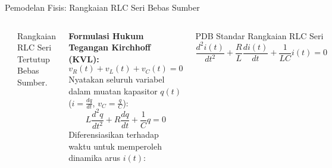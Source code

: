 \documentclass[aspectratio=169,10pt]{beamer}
\begin{document}
\begin{frame}{Pemodelan Fisis: Rangkaian RLC Seri Bebas Sumber}
  \begin{columns}
    \begin{center}
    \end{center}
    \vspace{-0.2cm}
    \begin{center}
      \footnotesize Rangkaian RLC Seri Tertutup Bebas Sumber.
    \end{center}

    \textbf{Formulasi Hukum Tegangan Kirchhoff (KVL):}
    \begin{equation}
      v_R(t) + v_L(t) + v_C(t) = 0
    \end{equation}
    Nyatakan seluruh variabel dalam muatan kapasitor $q(t)$ ($i = \frac{dq}{dt}$, $v_C = \frac{q}{C}$):
    \begin{equation*}
      L \frac{d^2 q}{dt^2} + R \frac{dq}{dt} + \frac{1}{C} q = 0
    \end{equation*}
    Diferensiasikan terhadap waktu untuk memperoleh dinamika arus $i(t)$:
    \begin{block}{PDB Standar Rangkaian RLC Seri}
      \begin{equation}
        \frac{d^2 i(t)}{dt^2} + \frac{R}{L} \frac{di(t)}{dt} + \frac{1}{LC} i(t) = 0
      \end{equation}
    \end{block}
  \end{columns}
\end{frame}
\end{document}

